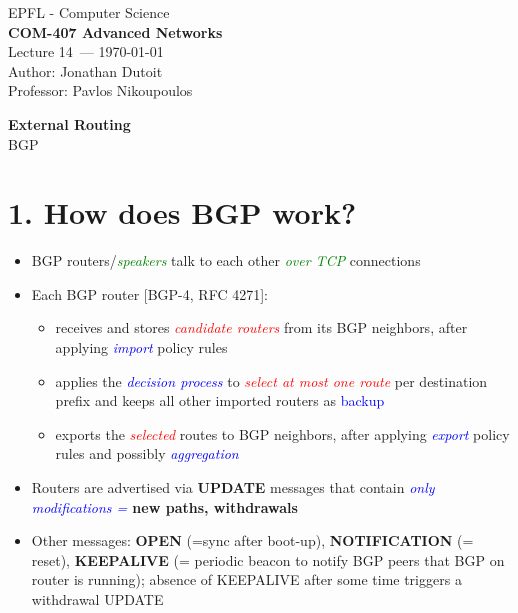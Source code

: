 \documentclass[11pt]{article}
\newcommand{\coursename}{COM-407 Advanced Networks}
\newcommand{\lecturenum}{14}
\newcommand{\lecturedate}{\today}
\newcommand{\professor}{Pavlos Nikoupoulos}
\begin{document}
\begin{center}
  {\large EPFL - Computer Science} \\[0.5em]
  {\Large \textbf{\coursename}} \\[0.5em]
  {\large Lecture \lecturenum\ --- \lecturedate} \\[0.5em]
  {\large Author: Jonathan Dutoit} \\[0.5em]
  {\large Professor: \professor} \\[0.5em]
\end{center}

\vspace{2cm}

\begin{center}
  {\LARGE \textbf{External Routing}} \\
  BGP
\end{center}

\vspace{1cm}

\section*{1. How does BGP work?}

\begin{itemize}
	\item BGP routers/\textit{\textcolor{green}{speakers}} talk to each other \textit{\textcolor{green}{over TCP}} connections
	\item Each BGP router [BGP-4, RFC 4271]:
		\begin{itemize}
			\item receives and stores \textit{\textcolor{red}{candidate routers}} from its BGP neighbors, after applying \textit{\textcolor{blue}{import}} policy rules
			\item applies the \textit{\textcolor{blue}{decision process}} to \textit{\textcolor{red}{select at most one route}} per destination prefix and keeps all other imported routers as \textcolor{blue}{backup}
	\item exports the \textit{\textcolor{red}{selected}} routes to BGP neighbors, after applying \textit{\textcolor{blue}{export}} policy rules and possibly \textit{\textcolor{blue}{aggregation}}
		\end{itemize}
	\item Routers are advertised via \textbf{UPDATE} messages that contain \textit{\textcolor{blue}{only modifications = }} \textbf{new paths, withdrawals}
	\item Other messages: \textbf{OPEN} (=sync after boot-up), \textbf{NOTIFICATION} (= reset), \textbf{KEEPALIVE} (= periodic beacon to notify BGP peers that BGP on router is running); absence of KEEPALIVE after some time triggers a withdrawal UPDATE
\end{itemize}
\end{document}
